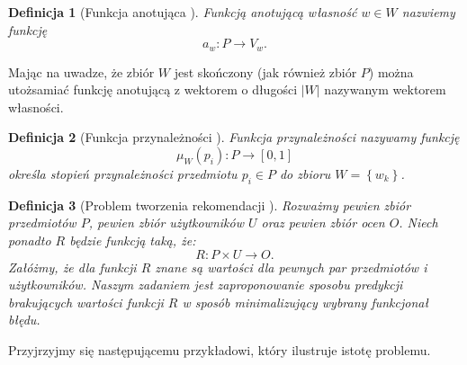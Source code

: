\documentclass[12pt,a4paper]{report}
\newtheorem{df}{Definicja}[chapter]
\newcommand{\set}[1]{\left\lbrace {#1} \right\rbrace}
\newcommand{\setUzytkownicy}{\mathit{U}}
\newcommand{\setPrzedmioty}{\mathit{P}}
\newcommand{\setOceny}{\mathit{O}}
\newcommand{\setWlasnosci}{\mathit{W}}
\begin{document}
\begin{df}[Funkcja anotująca {\citep[Sec 1.3]{kidzinski}}]
Funkcją anotującą własność $w \in \setWlasnosci$ nazwiemy funkcję 
$$
a_w \colon \setPrzedmioty \to V_w.
$$
\end{df}

Mając na uwadze, że zbiór $\setWlasnosci$ jest skończony (jak również zbiór $\setPrzedmioty$) można utożsamiać funkcję anotującą z wektorem o długości $|\setWlasnosci|$ nazywanym wektorem własności.

\begin{df}[Funkcja przynależności {\citep[Sec 4.2]{msi}}]
Funkcja przynależności nazywamy funkcję
$$
\mu_{\setWlasnosci}(p_i): \setPrzedmioty \to [0,1]
$$
określa stopień przynależności przedmiotu $p_i \in \setPrzedmioty$ do zbioru $\setWlasnosci=\set{w_k}$.
\end{df}

\begin{df}[Problem tworzenia rekomendacji {\citep[Sec 1.3]{kidzinski}}]
Rozważmy pewien zbiór przedmiotów $\setPrzedmioty$, pewien zbiór użytkowników $\setUzytkownicy$ oraz pewien zbiór ocen $\setOceny$. Niech ponadto $R$ będzie funkcją taką, że:
$$ 
R: \setPrzedmioty \times \setUzytkownicy \to \setOceny .
$$
Załóżmy, że dla funkcji $R$ znane są wartości dla pewnych par przedmiotów i użytkowników. Naszym zadaniem jest zaproponowanie sposobu predykcji brakujących wartości funkcji $R$ w sposób minimalizujący wybrany funkcjonał błędu. 
\end{df}

Przyjrzyjmy się następującemu przykładowi, który ilustruje istotę problemu.
\end{document}
